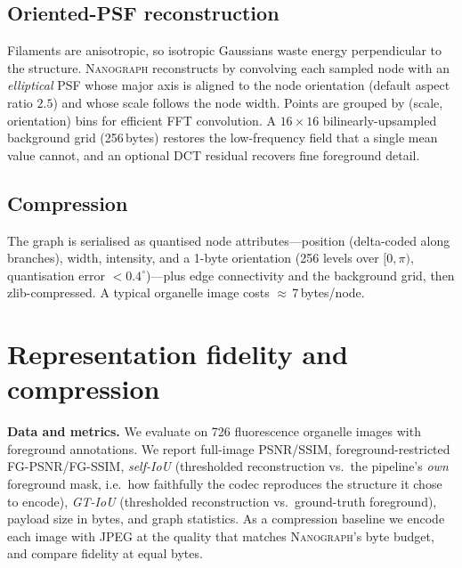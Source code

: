 \documentclass[runningheads]{llncs}
\newcommand{\method}{\textsc{Nanograph}\xspace}
\begin{document}
\subsection{Oriented-PSF reconstruction}
Filaments are anisotropic, so isotropic Gaussians waste energy perpendicular to
the structure. \method reconstructs by convolving each sampled node with an
\emph{elliptical} PSF whose major axis is aligned to the node orientation
(default aspect ratio $2.5$) and whose scale follows the node width. Points are
grouped by (scale, orientation) bins for efficient FFT convolution. A
$16\times16$ bilinearly-upsampled background grid (256\,bytes) restores the
low-frequency field that a single mean value cannot, and an optional DCT residual
recovers fine foreground detail.

\subsection{Compression}
The graph is serialised as quantised node attributes---position (delta-coded
along branches), width, intensity, and a 1-byte orientation (256 levels over
$[0,\pi)$, quantisation error $<0.4^\circ$)---plus edge connectivity and the
background grid, then zlib-compressed. A typical organelle image costs
$\approx$\,7\,bytes/node.

\section{Representation fidelity and compression}\label{sec:repr}
\noindent\textbf{Data and metrics.} We evaluate on 726 fluorescence organelle
images with foreground annotations. We report full-image PSNR/SSIM,
foreground-restricted FG-PSNR/FG-SSIM, \emph{self-IoU} (thresholded
reconstruction vs.\ the pipeline's \emph{own} foreground mask, i.e.\ how
faithfully the codec reproduces the structure it chose to encode),
\emph{GT-IoU} (thresholded reconstruction vs.\ ground-truth foreground),
payload size in bytes, and graph statistics. As a compression baseline we
encode each image with JPEG at the quality that matches \method's byte budget,
and compare fidelity at equal bytes.
\end{document}
